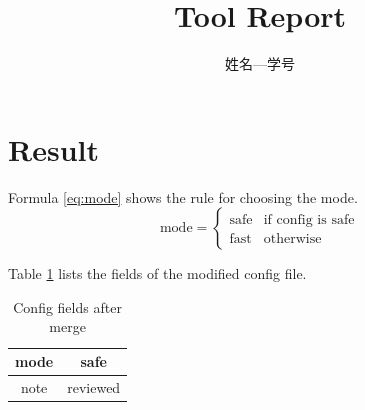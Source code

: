 \documentclass{article}       %
\begin{document}

\title{Tool Report}
\author{姓名—学号}            %
\maketitle                    %

\section{Result}

Formula \eqref{eq:mode} shows the rule for choosing the mode. %
\begin{equation}
    \text{mode} =
    \begin{cases}
        \text{safe} & \text{if config is safe} \\
        \text{fast} & \text{otherwise}
    \end{cases}
    \label{eq:mode}
\end{equation}

Table \ref{tab:config} lists the fields of the modified config file. %
\begin{table}[h]
    \centering
    \caption{Config fields after merge}  %
    \label{tab:config} %
    \begin{tabular}{|c|c|} %
        \hline %
        mode & safe \\
        \hline
        note & reviewed \\
        \hline
    \end{tabular}
\end{table}
\end{document}
